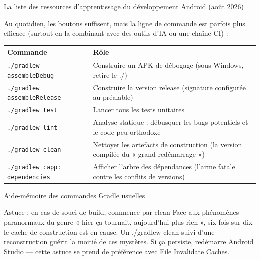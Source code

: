 \begin{center}\small\color{gray}La liste des ressources d’apprentissage du développement Android (août 2026)\end{center}


Au quotidien, les boutons suffisent, mais la ligne de commande est parfois plus efficace (surtout en la combinant avec des outils d’IA ou une chaîne CI) :

\begin{center}
\begin{tabularx}{\linewidth}{|X|X|}
\hline
\textbf{Commande} & \textbf{Rôle} \tabularnewline
\hline
\texttt{.\allowbreak /\allowbreak gradlew assembleDebug} & Construire un APK de débogage (sous Windows, retire le ./) \tabularnewline
\texttt{.\allowbreak /\allowbreak gradlew assembleRelease} & Construire la version release (signature configurée au préalable) \tabularnewline
\texttt{.\allowbreak /\allowbreak gradlew test} & Lancer tous les tests unitaires \tabularnewline
\texttt{.\allowbreak /\allowbreak gradlew lint} & Analyse statique : débusquer les bugs potentiels et le code peu orthodoxe \tabularnewline
\texttt{.\allowbreak /\allowbreak gradlew clean} & Nettoyer les artefacts de construction (la version compilée du « grand redémarrage ») \tabularnewline
\texttt{.\allowbreak /\allowbreak gradlew :app: dependencies} & Afficher l’arbre des dépendances (l’arme fatale contre les conflits de versions) \tabularnewline
\hline
\end{tabularx}
\end{center}

\begin{center}\small\color{gray}Aide-mémoire des commandes Gradle usuelles\end{center}

\begin{tcbinfo}{Astuce : en cas de souci de build, commence par clean}
Face aux phénomènes paranormaux du genre « hier ça tournait, aujourd’hui plus rien », six fois sur dix le cache de construction est en cause. Un ./gradlew clean suivi d’une reconstruction guérit la moitié de ces mystères. Si ça persiste, redémarre Android Studio — cette astuce se prend de préférence avec File Invalidate Caches.

\end{tcbinfo}



